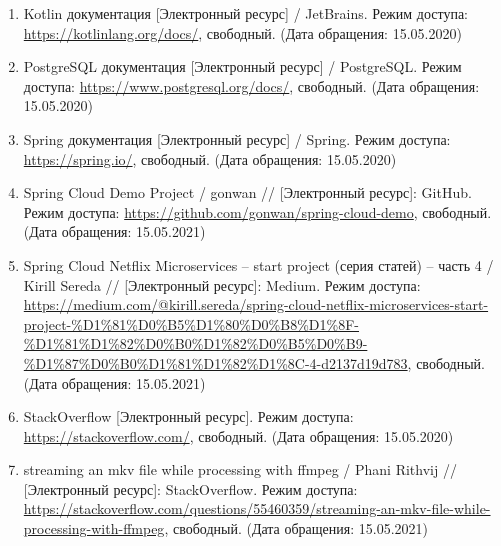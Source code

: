 \begin{enumerate}
    \item Kotlin документация [Электронный ресурс] / JetBrains. Режим доступа: \url{https://kotlinlang.org/docs/}, свободный. (Дата обращения: 15.05.2020)
    \item PostgreSQL документация [Электронный ресурс] / PostgreSQL. Режим доступа: \url{https://www.postgresql.org/docs/}, свободный. (Дата обращения: 15.05.2020)
    \item Spring документация [Электронный ресурс] / Spring. Режим доступа: \url{https://spring.io/}, свободный. (Дата обращения: 15.05.2020)
    \item Spring Cloud Demo Project / gonwan // [Электронный ресурс]: GitHub. Режим доступа: \url{https://github.com/gonwan/spring-cloud-demo}, свободный. (Дата обращения: 15.05.2021)
    \item Spring Cloud Netflix Microservices -- start project (серия статей) -- часть 4 / Kirill Sereda // [Электронный ресурс]: Medium. Режим доступа: \url{https://medium.com/@kirill.sereda/spring-cloud-netflix-microservices-start-project-%D1%81%D0%B5%D1%80%D0%B8%D1%8F-%D1%81%D1%82%D0%B0%D1%82%D0%B5%D0%B9-%D1%87%D0%B0%D1%81%D1%82%D1%8C-4-d2137d19d783}, свободный. (Дата обращения: 15.05.2021)
    \item StackOverflow [Электронный ресурс]. Режим доступа: \url{https://stackoverflow.com/}, свободный. (Дата обращения: 15.05.2020)
    \item streaming an mkv file while processing with ffmpeg / Phani Rithvij // [Электронный ресурс]: StackOverflow. Режим доступа: \url{https://stackoverflow.com/questions/55460359/streaming-an-mkv-file-while-processing-with-ffmpeg}, свободный. (Дата обращения: 15.05.2021)
\end{enumerate}